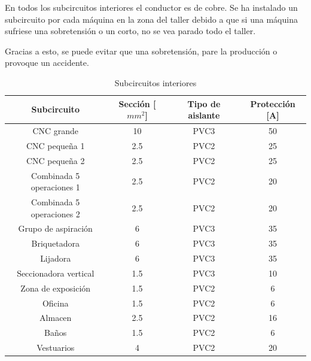 \documentclass[../main.tex]{subfiles}
\begin{document}
En todos los subcircuitos interiores el conductor es de cobre. Se ha instalado un subcircuito por cada máquina en la zona del taller debido a que si una máquina sufriese una sobretensión o un corto, no se vea parado todo el taller. 

Gracias a esto, se puede evitar que una sobretensión, pare la producción o provoque un accidente.

\begin{table}[H]
    \centering
    \begin{tabular}{c|c|c|c}
    Subcircuito & Sección [$mm^2$] & Tipo de aislante & Protección [A] \\ \hline
    CNC grande & 10 & PVC3 & 50 \\
    CNC pequeña 1 & 2.5 & PVC2 & 25 \\
    CNC pequeña 2 & 2.5 & PVC2 & 25 \\
    Combinada 5 operaciones 1 & 2.5 & PVC2 & 20 \\
    Combinada 5 operaciones 2 & 2.5 & PVC2 & 20 \\
    Grupo de aspiración & 6 & PVC3 & 35 \\
    Briquetadora & 6 & PVC3 & 35 \\
    Lijadora & 6 & PVC3 & 35 \\
    Seccionadora vertical & 1.5 & PVC3 & 10 \\
    Zona de exposición & 1.5 & PVC2 & 6 \\
    Oficina & 1.5 & PVC2 & 6 \\
    Almacen & 2.5 & PVC2 & 16 \\
    Baños & 1.5 & PVC2 & 6 \\
    Vestuarios & 4 & PVC2 & 20 \\
    \end{tabular}
    \caption{Subcircuitos interiores}
\end{table}
\end{document}
